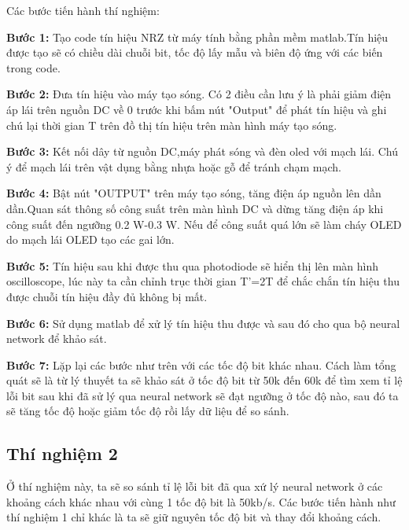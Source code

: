 Các bước tiến hành thí nghiệm:

\textbf{Bước 1:} Tạo code tín hiệu NRZ từ máy tính bằng phần mềm matlab.Tín hiệu được tạo sẽ có chiều dài chuỗi bit, tốc độ lấy mẫu và biên độ ứng với các biến trong code.

\textbf{Bước 2:} Đưa tín hiệu vào máy tạo sóng. Có 2 điều cần lưu ý là phải giảm điện áp lái trên nguồn DC về 0 trước khi bấm nút "Output" để phát tín hiệu và ghi chú lại thời gian T trên đồ thị tín hiệu trên màn hình máy tạo sóng.

\textbf{Bước 3:} Kết nối dây từ nguồn DC,máy phát sóng và đèn \ac{oled} với mạch lái. Chú ý để mạch lái trên vật dụng bằng nhựa hoặc gỗ để tránh chạm mạch.

\textbf{Bước 4:} Bật nút "OUTPUT" trên máy tạo sóng, tăng điện áp nguồn lên dần dần.Quan sát thông số công suất trên màn hình DC và dừng tăng điện áp khi công suất đến ngưỡng 0.2 W-0.3 W. Nếu để công suất quá lớn sẽ làm cháy OLED do mạch lái OLED tạo các gai lớn.

\textbf{Bước 5:} Tín hiệu sau khi được thu qua photodiode sẽ hiển thị lên màn hình oscilloscope, lúc này ta cần chỉnh trục thời gian T'=2T để chắc chắn tín hiệu thu được chuỗi tín hiệu đầy đủ không bị mất. 

\textbf{Bước 6:} Sử dụng matlab để xử lý tín hiệu thu được và sau đó cho qua bộ neural network để khảo sát.

\textbf{Bước 7:} Lặp lại các bước như trên với các tốc độ bit khác nhau. Cách làm tổng quát sẽ là từ lý thuyết ta sẽ khảo sát ở tốc độ bit từ 50k đến 60k để tìm xem tỉ lệ lỗi bit sau khi đã sử lý qua neural network sẽ đạt ngưỡng ở tốc độ nào, sau đó ta sẽ tăng tốc độ hoặc giảm tốc độ rồi lấy dữ liệu để so sánh.

\subsection{Thí nghiệm 2}

Ở thí nghiệm này, ta sẽ so sánh tỉ lệ lỗi bit đã qua xứ lý neural network ở các khoảng cách khác nhau với cùng 1 tốc độ bit là 50kb/s. Các bước tiến hành như thí nghiệm 1 chỉ khác là ta sẽ giữ nguyên tốc độ bit và thay đổi khoảng cách.





 









